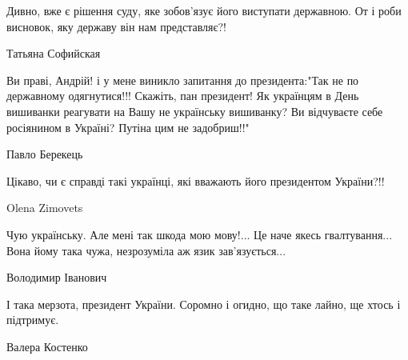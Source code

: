 Дивно, вже є рішення суду, яке зобов’язує його виступати державною. От і роби
висновок, яку державу він нам представляє?!

Татьяна Софийская

Ви праві, Андрій! і у мене виникло запитання до президента:"Так не по
державному одягнутися!!! Скажіть, пан президент! Як українцям в День
вишиванки реагувати на Вашу не українську вишиванку? Ви відчуваєте себе
росіянином в Україні? Путіна цим не задобриш!!"

Павло Берекець

Цікаво, чи є справді такі українці, які вважають його президентом України?!!

Olena Zimovets

Чую українську. Але мені так шкода мою мову!... Це наче якесь гвалтування...
Вона йому така чужа, незрозуміла аж язик зав'язується...

Володимир Іванович

І така мерзота, президент України. Соромно і огидно, що таке лайно, ще хтось і
підтримує.

Валера Костенко

